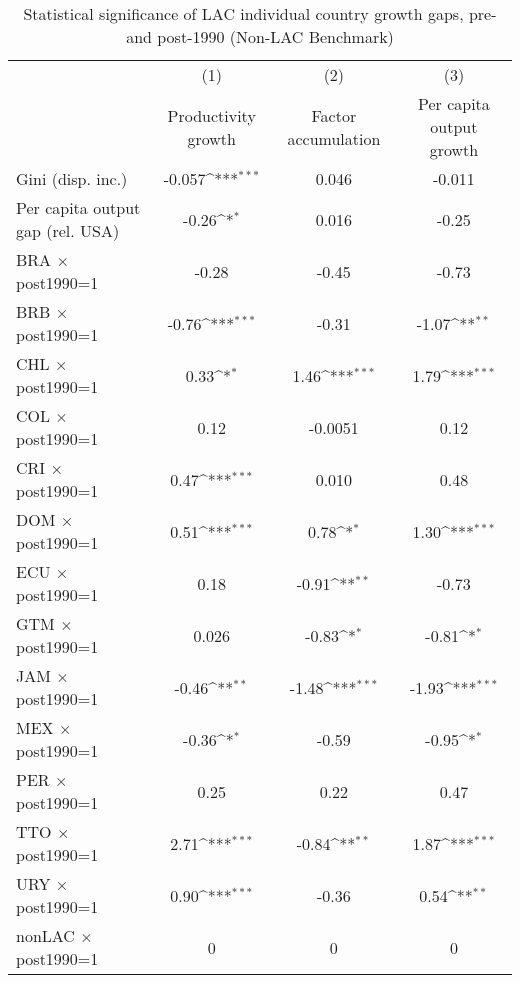 \begin{table}[htbp]\centering
\def\sym#1{\ifmmode^{#1}\else\(^{#1}\)\fi}
\caption{Statistical significance of LAC individual country growth gaps, pre- and post-1990 (Non-LAC Benchmark)}
\begin{tabular}{l*{3}{c}}
\toprule
                &\multicolumn{1}{c}{(1)}&\multicolumn{1}{c}{(2)}&\multicolumn{1}{c}{(3)}\\
                &\multicolumn{1}{c}{Productivity growth}&\multicolumn{1}{c}{Factor accumulation}&\multicolumn{1}{c}{Per capita output growth}\\
\midrule
Gini (disp. inc.)&   -0.057\sym{***}&    0.046         &   -0.011         \\
Per capita output gap (rel. USA)&    -0.26\sym{*}  &    0.016         &    -0.25         \\
BRA $\times$ post1990=1&    -0.28         &    -0.45         &    -0.73         \\
BRB $\times$ post1990=1&    -0.76\sym{***}&    -0.31         &    -1.07\sym{**} \\
CHL $\times$ post1990=1&     0.33\sym{*}  &     1.46\sym{***}&     1.79\sym{***}\\
COL $\times$ post1990=1&     0.12         &  -0.0051         &     0.12         \\
CRI $\times$ post1990=1&     0.47\sym{***}&    0.010         &     0.48         \\
DOM $\times$ post1990=1&     0.51\sym{***}&     0.78\sym{*}  &     1.30\sym{***}\\
ECU $\times$ post1990=1&     0.18         &    -0.91\sym{**} &    -0.73         \\
GTM $\times$ post1990=1&    0.026         &    -0.83\sym{*}  &    -0.81\sym{*}  \\
JAM $\times$ post1990=1&    -0.46\sym{**} &    -1.48\sym{***}&    -1.93\sym{***}\\
MEX $\times$ post1990=1&    -0.36\sym{*}  &    -0.59         &    -0.95\sym{*}  \\
PER $\times$ post1990=1&     0.25         &     0.22         &     0.47         \\
TTO $\times$ post1990=1&     2.71\sym{***}&    -0.84\sym{**} &     1.87\sym{***}\\
URY $\times$ post1990=1&     0.90\sym{***}&    -0.36         &     0.54\sym{**} \\
nonLAC $\times$ post1990=1&        0         &        0         &        0         \\
\midrule

\end{tabular}
\end{table}
